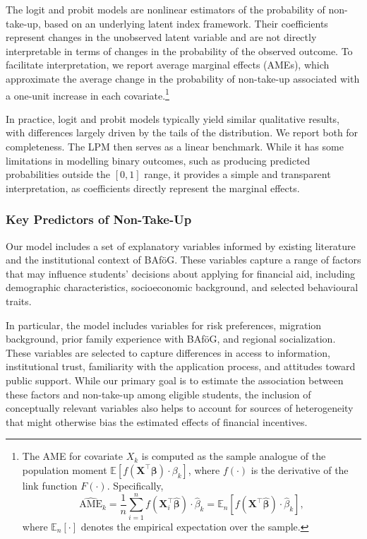 The logit and probit models are nonlinear estimators of the probability of non-take-up, based on an underlying latent index framework. 
Their coefficients represent changes in the unobserved latent variable and are not directly interpretable in terms of changes in the probability of the observed outcome. 
To facilitate interpretation, we report average marginal effects (AMEs), which approximate the average change in the probability of non-take-up associated with a one-unit increase in each covariate.\footnote{The AME for covariate \( X_k \) is computed as the sample analogue of the population moment \( \mathbb{E}[f(\mathbf{X}^\top \boldsymbol{\beta}) \cdot \beta_k] \), where \( f(\cdot) \) is the derivative of the link function \( F(\cdot) \). Specifically,
\[
    \widehat{\text{AME}}_k 
    = \frac{1}{n} \sum_{i=1}^n f(\mathbf{X}_i^\top \hat{\boldsymbol{\beta}}) \cdot \hat{\beta}_k
    = \mathbb{E}_n \left[ f(\mathbf{X}^\top \hat{\boldsymbol{\beta}}) \cdot \hat{\beta}_k \right],
\]
where \( \mathbb{E}_n[\cdot] \) denotes the empirical expectation over the sample.}

In practice, logit and probit models typically yield similar qualitative results, with differences largely driven by the tails of the distribution. We report both for completeness. The LPM then serves as a linear benchmark. While it has some limitations in modelling binary outcomes, such as producing predicted probabilities outside the \([0,1]\) range, it provides a simple and transparent interpretation, as coefficients directly represent the marginal effects.

\subsubsection{Key Predictors of Non-Take-Up}
Our model includes a set of explanatory variables informed by existing literature and the institutional context of BAföG. 
These variables capture a range of factors that may influence students' decisions about applying for financial aid, including demographic characteristics, socioeconomic background, and selected behavioural traits. 

In particular, the model includes variables for risk preferences, migration background, prior family experience with BAföG, and regional socialization. These variables are selected to capture differences in access to information, institutional trust, familiarity with the application process, and attitudes toward public support. While our primary goal is to estimate the association between these factors and non-take-up among eligible students, the inclusion of conceptually relevant variables also helps to account for sources of heterogeneity that might otherwise bias the estimated effects of financial incentives.

